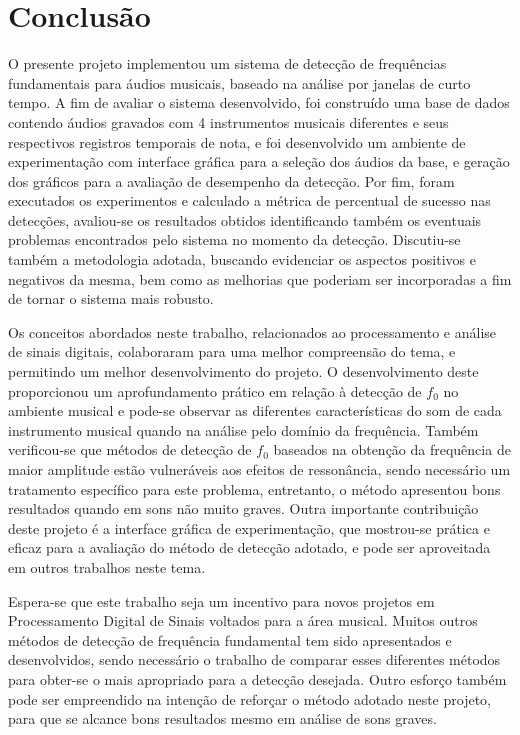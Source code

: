 \chapter{Conclusão} \label{cap6}

O presente projeto implementou um sistema de detecção de frequências fundamentais para áudios musicais, baseado na análise por janelas de curto tempo. A fim de avaliar o sistema desenvolvido, foi construído uma base de dados contendo áudios gravados com 4 instrumentos musicais diferentes e seus respectivos registros temporais de nota, e foi desenvolvido um ambiente de experimentação com interface gráfica para a seleção dos áudios da base, e geração dos gráficos para a avaliação de desempenho da detecção. Por fim, foram executados os experimentos e calculado a métrica de percentual de sucesso nas detecções, avaliou-se os resultados obtidos identificando também os eventuais problemas encontrados pelo sistema no momento da detecção. Discutiu-se também a metodologia adotada, buscando evidenciar os aspectos positivos e negativos da mesma, bem como as melhorias que poderiam ser incorporadas a fim de tornar o sistema mais robusto.


Os conceitos abordados neste trabalho, relacionados ao processamento e análise de sinais digitais, colaboraram para uma melhor compreensão do tema, e permitindo um melhor desenvolvimento do projeto. O desenvolvimento deste proporcionou um aprofundamento prático em relação à detecção de $f_0$ no ambiente musical e pode-se observar as diferentes características do som de cada instrumento musical quando na análise pelo domínio da frequência. Também verificou-se que métodos de detecção de $f_0$ baseados na obtenção da frequência de maior amplitude estão vulneráveis aos efeitos de ressonância, sendo necessário um tratamento específico para este problema, entretanto, o método apresentou bons resultados quando em sons não muito graves. Outra importante contribuição deste projeto é a interface gráfica de experimentação, que mostrou-se prática e eficaz para a avaliação do método de detecção adotado, e pode ser aproveitada em outros trabalhos neste tema.



Espera-se que este trabalho seja um incentivo para novos projetos em Processamento Digital de Sinais voltados para a área musical. Muitos outros métodos de detecção de frequência fundamental tem sido apresentados e desenvolvidos, sendo necessário o trabalho de comparar esses diferentes métodos para obter-se o mais apropriado para a detecção desejada. Outro esforço também pode ser empreendido na intenção de reforçar o método adotado neste projeto, para que se alcance bons resultados mesmo em análise de sons graves.

